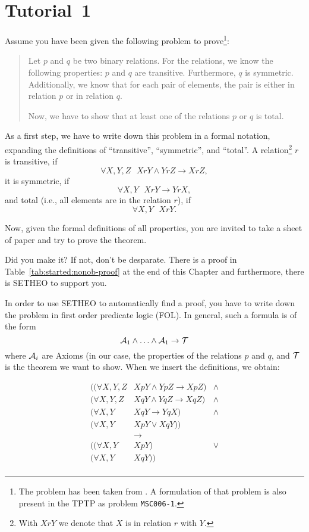 %

\section{Tutorial~1}

Assume you have been given the following problem to prove\footnote{
	The problem has been taken from \cite{PELLAAR}. A formulation
	of that problem is also present in the TPTP \cite{SSY94} as problem
	{\tt MSC006-1}.}:
\begin{quote}
Let $p$ and $q$ be two binary relations.
For the relations, we know the following properties:
$p$ and $q$ are transitive. Furthermore, $q$ is symmetric.
Additionally, we know that for each pair of elements, the pair is
either in relation $p$ or in relation $q$.

Now, we have to show that at least one of the relations $p$ or $q$
is total.
\end{quote}

As a first step, we have to write down this problem in a formal
notation, expanding the definitions of ``transitive'', ``symmetric'',
and ``total''. 
A relation\footnote{
	With $XrY$ we denote that $X$ is in relation $r$ with $Y$.
	}
$r$ is transitive, if
\[ \forall X,Y,Z \mbox{\ \ \ } XrY \wedge YrZ \rightarrow XrZ,\]
it is symmetric, if
\[ \forall X,Y \mbox{\ \ \ } XrY \rightarrow YrX,\]
and total (i.e., all elements are in the relation $r$), if
\[ \forall X,Y \mbox{\ \ \ } XrY.\]

Now, given the formal definitions of all properties, you are invited
to take a sheet of paper and try to prove the theorem.

Did you make it?
If not, don't be desparate. There is a proof in Table~\ref{tab:started:nonob-proof} at the end of this Chapter and furthermore, there is SETHEO to
support you.

In order to use SETHEO to automatically find a proof, you have to write
down the problem in first order predicate logic (FOL).
In general, such a formula is of the form
\[ 
{\cal A}_1 \wedge \ldots  \wedge {\cal A}_1 \rightarrow {\cal T}
\]
where ${\cal A}_i$ are Axioms (in our case, the properties of the relations
$p$ and $q$, and ${\cal T}$ is the theorem we want to show.
When we insert the definitions, we obtain:

\[
\begin{array}{lll}
(( \forall X,Y,Z  & XpY \wedge YpZ \rightarrow XpZ ) & \wedge \\
( \forall X,Y,Z  & XqY \wedge YqZ \rightarrow XqZ ) & \wedge \\
( \forall X,Y  & XqY \rightarrow YqX )& \wedge \\
( \forall X,Y  & XpY \vee XqY)) &  \\
& \rightarrow & \\
(( \forall X,Y  & XpY ) & \vee \\
( \forall X,Y  & XqY )) & \\
\end{array}
\]

